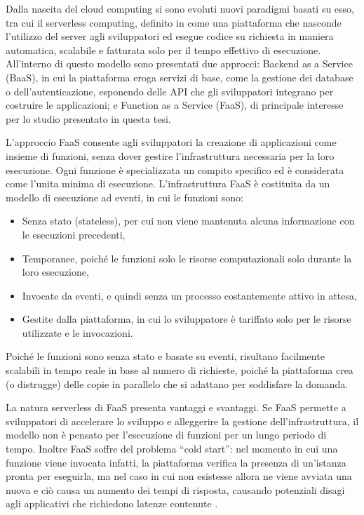 Dalla nascita del cloud computing si sono evoluti nuovi paradigmi basati su esso, tra cui il serverless computing, definito in \cite{Castro2019} come una piattaforma che nasconde l'utilizzo del server agli sviluppatori ed esegue codice su richiesta in maniera automatica, scalabile e fatturata solo per il tempo effettivo di esecuzione. All'interno di questo modello sono presentati due approcci: Backend as a Service (BaaS), in cui la piattaforma eroga servizi di base, come la gestione dei database o dell'autenticazione, esponendo delle API che gli sviluppatori integrano per costruire le applicazioni; e Function as a Service (FaaS), di principale interesse per lo studio presentato in questa tesi.

L'approccio FaaS consente agli sviluppatori la creazione di applicazioni come insieme di funzioni, senza dover gestire l'infrastruttura necessaria per la loro esecuzione. Ogni funzione è specializzata un compito specifico ed è considerata come l'unita minima di esecuzione. L'infrastruttura FaaS è costituita da un modello di esecuzione ad eventi, in cui le funzioni sono:

\begin{itemize}
    \item Senza stato (stateless), per cui non viene mantenuta alcuna informazione con le esecuzioni precedenti,

    \item Temporanee, poiché le funzioni solo le risorse computazionali solo durante la loro esecuzione,

    \item Invocate da eventi, e quindi senza un processo costantemente attivo in attesa,

    \item Gestite dalla piattaforma, in cui lo sviluppatore è tariffato solo per le risorse utilizzate e le invocazioni.
\end{itemize}

Poiché le funzioni sono senza stato e basate su eventi, risultano facilmente scalabili in tempo reale in base al numero di richieste, poiché la piattaforma crea (o distrugge) delle copie in parallelo che si adattano per soddisfare la domanda.

La natura serverless di FaaS presenta vantaggi e svantaggi. Se FaaS permette a sviluppatori di accelerare lo sviluppo e alleggerire la gestione dell'infrastruttura, il modello non è pensato per l'esecuzione di funzioni per un lungo periodo di tempo. Inoltre FaaS soffre del problema ``cold start'': nel momento in cui una funzione viene invocata infatti, la piattaforma verifica la presenza di un’istanza pronta per eseguirla, ma nel caso in cui non esistesse allora ne viene avviata una nuova e ciò causa un aumento dei tempi di risposta, causando potenziali disagi agli applicativi che richiedono latenze contenute \cite{Ana2024}.

